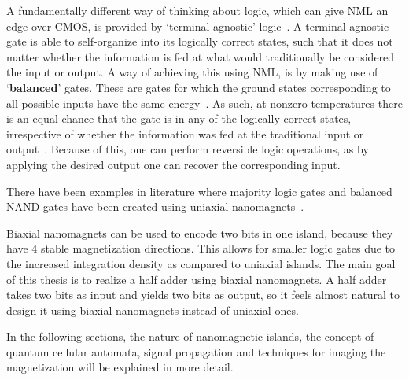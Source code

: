 \documentclass[11pt,a4paper,english]{article}
\begin{document}
A fundamentally different way of thinking about logic, which can give NML an edge over CMOS, is provided by `terminal-agnostic' logic~\cite{FactorizationMemcomputing}. A terminal-agnostic gate is able to self-organize into its logically correct states, such that it does not matter whether the information is fed at what would traditionally be considered the input or output. A way of achieving this using NML, is by making use of `\textbf{balanced}' gates. These are gates for which the ground states corresponding to all possible inputs have the same energy~\cite{GYP-18}. As such, at nonzero temperatures there is an equal chance that the gate is in any of the logically correct states, irrespective of whether the information was fed at the traditional input or output~\cite{gypens2020nanomagnetic}. Because of this, one can perform reversible logic operations, as by applying the desired output one can recover the corresponding input. \par 
There have been examples in literature where majority logic gates and balanced NAND gates have been created using uniaxial nanomagnets~\cite{GYP-18}. \par
Biaxial nanomagnets can be used to encode two bits in one island, because they have 4 stable magnetization directions. This allows for smaller logic gates due to the increased integration density as compared to uniaxial islands. The main goal of this thesis is to realize a half adder using biaxial nanomagnets. A half adder takes two bits as input and yields two bits as output, so it feels almost natural to design it using biaxial nanomagnets instead of uniaxial ones. \par
In the following sections, the nature of nanomagnetic islands, the concept of quantum cellular automata, signal propagation and techniques for imaging the magnetization will be explained in more detail.
\end{document}
